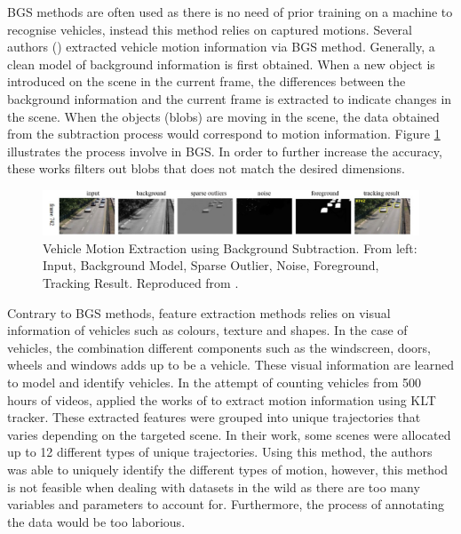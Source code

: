 BGS methods are often used as there is no need of prior training on a machine to
recognise vehicles, instead this method relies on captured motions. Several
authors ()
extracted vehicle motion information via BGS method. Generally, a clean model of
background information is first obtained. When a new object is introduced on the
scene in the current frame, the differences between the background information
and the current frame is extracted to indicate changes in the scene. When the
objects (blobs) are moving in the scene, the data obtained from the subtraction
process would correspond to motion information. Figure \ref{fig:bgs2}
illustrates the process involve in BGS. In order to further increase the
accuracy, these works filters out blobs that does not match the desired
dimensions.

\begin{figure}[hbt!]
  \centering
 \includegraphics[width=1\textwidth]{image/lit/bgs.PNG}
  \caption[Vehicle Motion Extraction using Background Subtraction. From left:
  Input, Background Model, Sparse Outlier, Noise, Foreground, Tracking Result]
  {Vehicle Motion Extraction using Background Subtraction. From left: Input,
  Background Model, Sparse Outlier, Noise, Foreground, Tracking Result.
  Reproduced from .}
\label{fig:bgs2}
\end{figure}

Contrary to BGS methods, feature extraction methods relies on visual information
of vehicles such as colours, texture and shapes. In the case of vehicles, the
combination different components such as the windscreen, doors, wheels and
windows adds up to be a vehicle. These visual information are learned to model
and identify vehicles. In the attempt of counting vehicles from 500 hours of
videos,  applied the works of
 to extract motion information using KLT tracker.
These extracted features were grouped into unique trajectories that varies
depending on the targeted scene. In their work, some scenes were allocated up to
12 different types of unique trajectories. Using this method, the authors was
able to uniquely identify the different types of motion, however, this method is
not feasible when dealing with datasets in the wild as there are too many
variables and parameters to account for. Furthermore, the process of annotating
the data would be too laborious.

